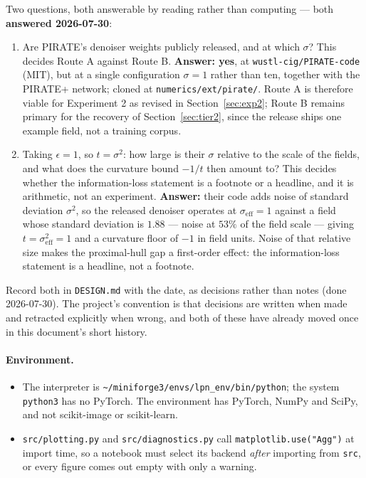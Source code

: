 \documentclass[11pt]{article}
\theoremstyle{definition}
\newcommand{\code}[1]{\texttt{#1}}
\begin{document}
Two questions, both answerable by reading rather than computing — both \textbf{answered 2026-07-30}:
\begin{enumerate}[leftmargin=2em]
\item Are PIRATE's denoiser weights publicly released, and at which $\sigma$? This decides Route A against Route B. \textbf{Answer: yes}, at \code{wustl-cig/PIRATE-code} (MIT), but at a single configuration $\sigma = 1$ rather than ten, together with the PIRATE+ network; cloned at \code{numerics/ext/pirate/}. Route A is therefore viable for Experiment 2 as revised in Section~\ref{sec:exp2}; Route B remains primary for the recovery of Section~\ref{sec:tier2}, since the release ships one example field, not a training corpus.
\item Taking $\epsilon=1$, so $t=\sigma^2$: how large is their $\sigma$ relative to the scale of the fields, and what does the curvature bound $-1/t$ then amount to? This decides whether the information-loss statement is a footnote or a headline, and it is arithmetic, not an experiment. \textbf{Answer:} their code adds noise of standard deviation $\sigma^2$, so the released denoiser operates at $\sigma_{\mathrm{eff}} = 1$ against a field whose standard deviation is $1.88$ — noise at $53\%$ of the field scale — giving $t = \sigma_{\mathrm{eff}}^2 = 1$ and a curvature floor of $-1$ in field units. Noise of that relative size makes the proximal-hull gap a first-order effect: the information-loss statement is a headline, not a footnote.
\end{enumerate}

Record both in \code{DESIGN.md} with the date, as decisions rather than notes (done 2026-07-30). The project's convention is that decisions are written when made and retracted explicitly when wrong, and both of these have already moved once in this document's short history.

\paragraph{Environment.}
\begin{itemize}[leftmargin=2em]
\item The interpreter is \code{\~{}/miniforge3/\allowbreak envs/\allowbreak lpn\_env/\allowbreak bin/\allowbreak python}; the system \code{python3} has no PyTorch. The environment has PyTorch, NumPy and SciPy, and not scikit-image or scikit-learn.
\item \code{src/plotting.py} and \code{src/diagnostics.py} call \code{matplotlib.use("Agg")} at import time, so a notebook must select its backend \emph{after} importing from \code{src}, or every figure comes out empty with only a warning.
\end{itemize}
\end{document}
